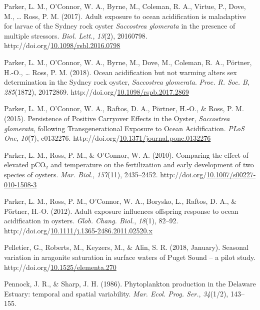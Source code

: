 \documentclass [11pt, proquest] {uwthesis}[2015/03/03]
\newlength{\cslhangindent}
\newenvironment{CSLReferences}%
{\setlength{\parindent}{0pt}%
\everypar{\setlength{\hangindent}{\cslhangindent}}\ignorespaces}%
{\par}
\begin{document}
\begin{CSLReferences}{1}{0}
\leavevmode\hypertarget{ref-Parker2017}{}%
Parker, L. M., O'Connor, W. A., Byrne, M., Coleman, R. A., Virtue, P., Dove, M., \ldots{} Ross, P. M. (2017). {Adult exposure to ocean acidification is maladaptive for larvae of the Sydney rock oyster \emph{Saccostrea glomerata} in the presence of multiple stressors}. \emph{Biol. Lett.}, \emph{13}(2), 20160798. http://doi.org/\href{https://doi.org/10.1098/rsbl.2016.0798}{10.1098/rsbl.2016.0798}

\leavevmode\hypertarget{ref-Parker2018}{}%
Parker, L. M., O'Connor, W. A., Byrne, M., Dove, M., Coleman, R. A., Pörtner, H.-O., \ldots{} Ross, P. M. (2018). {Ocean acidification but not warming alters sex determination in the Sydney rock oyster, \emph{Saccostrea glomerata}}. \emph{Proc. R. Soc. B}, \emph{285}(1872), 20172869. http://doi.org/\href{https://doi.org/10.1098/rspb.2017.2869}{10.1098/rspb.2017.2869}

\leavevmode\hypertarget{ref-Parker2015}{}%
Parker, L. M., O'Connor, W. A., Raftos, D. A., Pörtner, H.-O., \& Ross, P. M. (2015). {Persistence of Positive Carryover Effects in the Oyster, \emph{Saccostrea glomerata}, following Transgenerational Exposure to Ocean Acidification}. \emph{PLoS One}, \emph{10}(7), e0132276. http://doi.org/\href{https://doi.org/10.1371/journal.pone.0132276}{10.1371/journal.pone.0132276}

\leavevmode\hypertarget{ref-Parker2010}{}%
Parker, L. M., Ross, P. M., \& O'Connor, W. A. (2010). {Comparing the effect of elevated {pCO\(_2\)} and temperature on the fertilization and early development of two species of oysters}. \emph{Mar. Biol.}, \emph{157}(11), 2435--2452. http://doi.org/\href{https://doi.org/10.1007/s00227-010-1508-3}{10.1007/s00227-010-1508-3}

\leavevmode\hypertarget{ref-Parker2012}{}%
Parker, L. M., Ross, P. M., O'Connor, W. A., Borysko, L., Raftos, D. A., \& Pörtner, H.-O. (2012). {Adult exposure influences offspring response to ocean acidification in oysters}. \emph{Glob. Chang. Biol.}, \emph{18}(1), 82--92. http://doi.org/\href{https://doi.org/10.1111/j.1365-2486.2011.02520.x}{10.1111/j.1365-2486.2011.02520.x}

\leavevmode\hypertarget{ref-Pelletier2018}{}%
Pelletier, G., Roberts, M., Keyzers, M., \& Alin, S. R. (2018, January). {Seasonal variation in aragonite saturation in surface waters of Puget Sound -- a pilot study}. http://doi.org/\href{https://doi.org/10.1525/elementa.270}{10.1525/elementa.270}

\leavevmode\hypertarget{ref-Pennock1986}{}%
Pennock, J. R., \& Sharp, J. H. (1986). {Phytoplankton production in the Delaware Estuary: temporal and spatial variability}. \emph{Mar. Ecol. Prog. Ser.}, \emph{34}(1/2), 143--155.


\end{CSLReferences}
\end{document}

